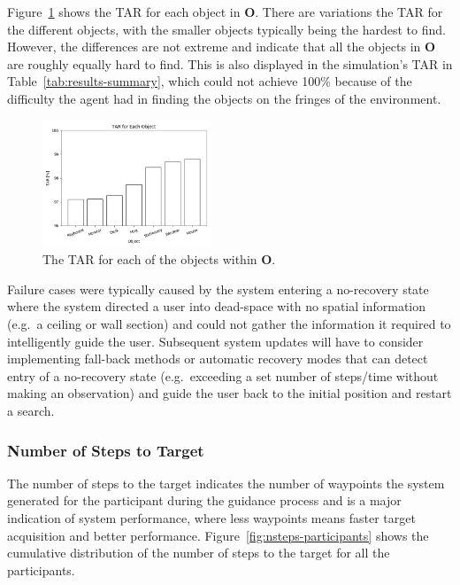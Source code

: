 \documentclass[a4paper, twoside]{article}
\begin{document}
Figure~\ref{fig:tar-objects} shows the TAR for each object in $\mathbf{O}$. There are variations the TAR for the different objects, with the smaller objects typically being the hardest to find. However, the differences are not extreme and indicate that all the objects in $\mathbf{O}$ are roughly equally hard to find. This is also displayed in the simulation's TAR in Table~\ref{tab:results-summary}, which could not achieve 100\% because of the difficulty the agent had in finding the objects on the fringes of the environment. 

\begin{figure}
  \centering
  \includegraphics[width=0.45\textwidth]{figures/tar_objects.png}
  \caption{The TAR for each of the objects within $\mathbf{O}$. }\label{fig:tar-objects}
\end{figure}

Failure cases were typically caused by the system entering a no-recovery state where the system directed a user into dead-space with no spatial information (e.g.\ a ceiling or wall section) and could not gather the information it required to intelligently guide the user. Subsequent system updates will have to consider implementing fall-back methods or automatic recovery modes that can detect entry of a no-recovery state (e.g.\ exceeding a set number of steps/time without making an observation) and guide the user back to the initial position and restart a search.

\subsubsection{Number of Steps to Target}

\noindent The number of steps to the target indicates the number of waypoints the system generated for the participant during the guidance process and is a major indication of system performance, where less waypoints means faster target acquisition and better performance. Figure~\ref{fig:nsteps-participants} shows the cumulative distribution of the number of steps to the target for all the participants. 
\end{document}
